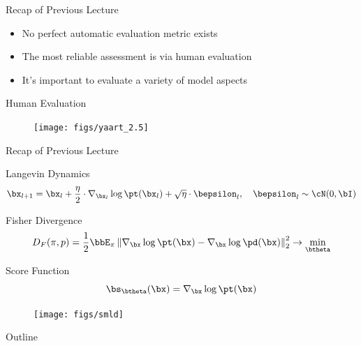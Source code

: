 \documentclass{beamer}
\begin{document}
\begin{frame}{Recap of Previous Lecture}
	\begin{itemize}
		\item No perfect automatic evaluation metric exists
		\item The most reliable assessment is via human evaluation
		\item It's important to evaluate a variety of model aspects
	\end{itemize}
	\begin{block}{Human Evaluation}
		\begin{figure}
			\texttt{[image: figs/yaart\_2.5]}
		\end{figure}
	\end{block}
\end{frame}
\begin{frame}{Recap of Previous Lecture}
		\vspace{-0.3cm}
	\begin{block}{Langevin Dynamics}
		\vspace{-0.3cm}
		\[
			\bx_{l + 1} = \bx_l + \frac{\eta}{2} \cdot \nabla_{\bx_l} \log \pt(\bx_l) + \sqrt{\eta} \cdot \bepsilon_l, \quad \bepsilon_l \sim \cN(0, \bI)
		\]
		\vspace{-0.7cm}
	\end{block}
	\begin{block}{Fisher Divergence}
		\vspace{-0.3cm}
		\[
			D_F(\pi, p) = \frac{1}{2}\bbE_{\pi}\left\| \nabla_{\bx}\log \pt(\bx) - \nabla_\bx \log \pd(\bx) \right\|_2^2 \rightarrow \min_{\btheta}
		\]
		\vspace{-0.7cm}
	\end{block}
	\begin{block}{Score Function}
		\vspace{-0.5cm}
		 \[
			 \bs_{\btheta}(\bx) = \nabla_{\bx}\log \pt(\bx)
		 \]
	 \vspace{-0.8cm}
	\end{block}
	\begin{figure}
		\centering
		\texttt{[image: figs/smld]}
	\end{figure}
\end{frame}
\begin{frame}{Outline}
	\tableofcontents
\end{frame}
\end{document}

